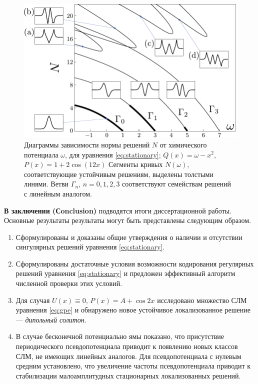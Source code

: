 \documentclass[candidate, href, colorlinks]{disser}
\begin{document}
\begin{figure}[h]
\centering
	\includegraphics[scale = 1]{pic/branches}
	\caption{
		Диаграммы зависимости нормы решений $N$ от химического потенциала $\omega$, для уравнения \eqref{eq:stationary}; $Q(x) = \omega - x^2$, $P(x) = 1 + 2 \cos (12 x)$
		Сегменты кривых $N(\omega)$, соответствующие устойчивым решениям, выделены толстыми линями.
		Ветви $\Gamma_n$, $n = 0, 1, 2, 3$ соответствуют семействам решений с линейным аналогом.
	}
\label{fig:branches}
\end{figure}


\textbf{В заключении (Сonclusion)} подводятся итоги диссертационной работы.
Основные результаты результаты могут быть представлены следующим образом.
\begin{enumerate}
	\item Сформулированы и доказаны общие утверждения о наличии и отсутствии сингулярных решений уравнения \eqref{eq:stationary}.
	\item Сформулированы достаточные условия возможности кодирования регулярных решений уравнения \eqref{eq:stationary} и предложен эффективный алгоритм численной проверки этих условий.
	\item Для случая $U(x) \equiv 0$, $P(x) = A + \cos 2x$ исследовано множество СЛМ уравнения \eqref{eq:gpe} и обнаружено новое устойчивое локализованное решение --- {\it дипольный солитон}.
	\item В случае бесконечной потенциально ямы показано, что присутствие периодического псевдопотенциала приводит к появлению новых классов СЛМ, не имеющих линейных аналогов.
		Для псевдопотенциала с нулевым средним установлено, что увеличение частоты псевдопотенциала приводит к стабилизации малоамплитудных стационарных локализованных решений.
\end{enumerate}
\end{document}
